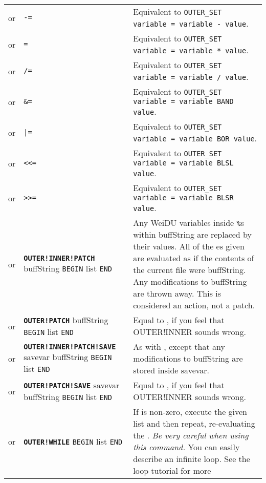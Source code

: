 \documentclass{article}
\def\ttref#1{\ahrefloc{#1}{\tt #1}}
\def\DEFINE#1{{\tt \bf #1}\label{#1}\index{#1}}
\def\t#1{{\tt #1}}
\def\Slist{{\color{red} list }}
\begin{document}
\begin{tabular}{cp{10in}|p{10in}}
or & \ttref{OUTER!SET} \ttref{variable} \t{-=} \ttref{value} &
  Equivalent to \t{OUTER_SET variable = variable - value}. \\
or & \ttref{OUTER!SET} \ttref{variable} \t{*=} \ttref{value} &
  Equivalent to \t{OUTER_SET variable = variable * value}. \\
or & \ttref{OUTER!SET} \ttref{variable} \t{/=} \ttref{value} &
  Equivalent to \t{OUTER_SET variable = variable / value}. \\
or & \ttref{OUTER!SET} \ttref{variable} \t{\&=} \ttref{value} &
  Equivalent to \t{OUTER_SET variable = variable BAND value}. \\
or & \ttref{OUTER!SET} \ttref{variable} \t{|=} \ttref{value} &
  Equivalent to \t{OUTER_SET variable = variable BOR value}. \\
or & \ttref{OUTER!SET} \ttref{variable} \t{<<=} \ttref{value} &
  Equivalent to \t{OUTER_SET variable = variable BLSL value}. \\
or & \ttref{OUTER!SET} \ttref{variable} \t{>>=} \ttref{value} &
  Equivalent to \t{OUTER_SET variable = variable BLSR value}. \\
or & \DEFINE{OUTER!INNER!PATCH} buffString \t{BEGIN} \ttref{patch} \Slist \t{END} &
  Any WeiDU variables inside \t{\%}s within buffString are replaced by
  their values. All of the \ttref{patch}es given are evaluated as if the
  contents of the current file were buffString. Any modifications to
  buffString are thrown away. This is considered an action, not a patch. \\
or & \DEFINE{OUTER!PATCH} buffString \t{BEGIN} \ttref{patch} \Slist \t{END} &
  Equal to \ttref{OUTER!INNER!PATCH}, if you feel that OUTER!INNER sounds wrong. \\
or & \DEFINE{OUTER!INNER!PATCH!SAVE} savevar buffString \t{BEGIN} \ttref{patch} \Slist \t{END} &
  As with \ttref{OUTER!INNER!PATCH}, except that any modifications to buffString are stored inside
  savevar. \\
or & \DEFINE{OUTER!PATCH!SAVE} savevar buffString \t{BEGIN} \ttref{patch} \Slist \t{END} &
  Equal to \ttref{OUTER!INNER!PATCH!SAVE}, if you feel that OUTER!INNER sounds wrong. \\
or & \DEFINE{OUTER!WHILE} \ttref{value} \t{BEGIN}
  \ttref{TP2 Action} \Slist \t{END} &
  If \ttref{value} is non-zero, execute the given \ttref{TP2 Action} \Slist and
  then repeat, re-evaluating the \ttref{value}.
  {\em Be very careful when using this command. } You can easily describe
  an infinite loop. See the \ttref{WHILE} loop tutorial for more

\end{tabular}
\end{document}
